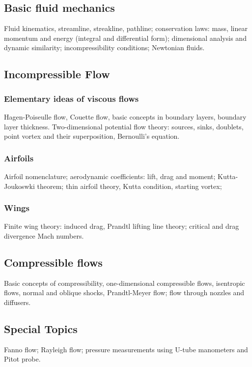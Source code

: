 \subsection{Basic fluid mechanics}
Fluid kinematics, streamline, streakline, pathline; conservation laws: mass, linear momentum and energy (integral and differential form); dimensional analysis and dynamic similarity; incompressibility conditions; Newtonian fluids.

\subsection{Incompressible Flow}

\subsubsection{Elementary ideas of viscous flows}
Hagen-Poiseulle flow, Couette flow, basic concepts in boundary layers, boundary layer thickness. Two-dimensional potential flow theory: sources, sinks, doublets, point vortex and their superposition, Bernoulli's equation.

\subsubsection{Airfoils}
Airfoil nomenclature; aerodynamic coefficients: lift, drag and moment; Kutta-Joukoswki theorem; thin airfoil theory, Kutta condition, starting vortex;

\subsubsection{Wings}
Finite wing theory: induced drag, Prandtl lifting line theory; critical and drag divergence Mach numbers.

\subsection{Compressible flows}
Basic concepts of compressibility, one-dimensional compressible flows, isentropic flows, normal and oblique shocks, Prandtl-Meyer flow; flow through nozzles and diffusers.

\subsection{Special Topics}
Fanno flow; Rayleigh flow; pressure measurements using U-tube manometers and Pitot probe.

